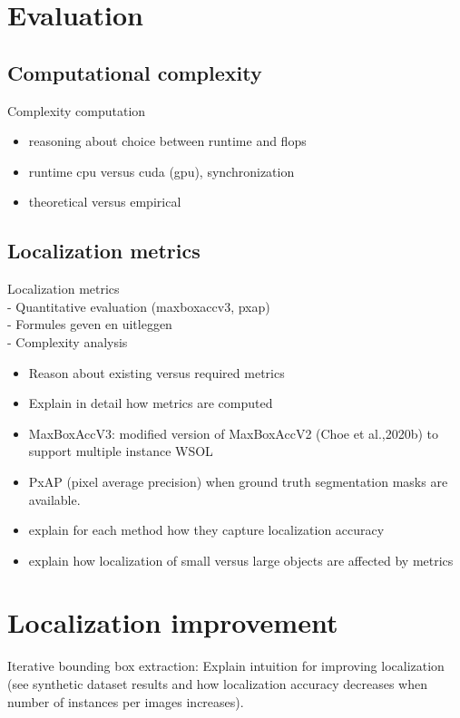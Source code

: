 \section{Evaluation}
\subsection{Computational complexity}
Complexity computation
\begin{itemize}
    \item reasoning about choice between runtime and flops
    \item runtime cpu versus cuda (gpu), synchronization
    \item theoretical versus empirical
\end{itemize}

\subsection{Localization metrics} \label{sec:localization_metrics}
Localization metrics \\
- Quantitative evaluation (maxboxaccv3, pxap) \\
- Formules geven en uitleggen \\
- Complexity analysis
\begin{itemize}
    \item Reason about existing versus required metrics
    \item Explain in detail how metrics are computed
    \item MaxBoxAccV3: modified version of MaxBoxAccV2 (Choe et al.,2020b) to support multiple instance WSOL
    \item PxAP (pixel average precision) when ground truth segmentation masks are available.
    \item explain for each method how they capture localization accuracy
    \item explain how localization of small versus large objects are affected by metrics
\end{itemize}

\section{Localization improvement}
Iterative bounding box extraction: Explain intuition for improving localization (see synthetic dataset results and how localization accuracy decreases when number of instances per images increases).

